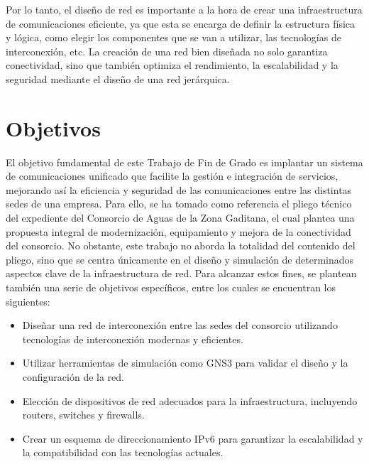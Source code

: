 \vspace{0.5cm}
Por lo tanto, el diseño de red es importante a la hora de crear una infraestructura de comunicaciones eficiente,
ya que esta se encarga de definir la estructura física y lógica, como elegir los componentes que se van a
utilizar, las tecnologías de interconexión, etc. La creación de una red bien diseñada no solo garantiza
conectividad, sino que también optimiza el rendimiento, la escalabilidad y la seguridad mediante el
diseño de una red jerárquica.

\section{Objetivos}
El objetivo fundamental de este Trabajo de Fin de Grado es implantar un sistema de comunicaciones unificado que facilite la gestión e integración de servicios, mejorando así la eficiencia y seguridad de las comunicaciones entre las distintas sedes de una empresa. Para ello, se ha tomado como referencia el pliego técnico del expediente \cite{expediente0062020} del Consorcio de Aguas de la Zona Gaditana, el cual plantea una propuesta integral de modernización, equipamiento y mejora de la conectividad del consorcio. No obstante, este trabajo no aborda la totalidad del contenido del pliego, sino que se centra únicamente en el diseño y simulación de determinados aspectos clave de la infraestructura de red. Para alcanzar estos fines, 
se plantean también una serie de objetivos específicos, entre los cuales se encuentran los siguientes:

\begin{itemize}
  \item Diseñar una red de interconexión entre las sedes del consorcio utilizando tecnologías de interconexión modernas y eficientes.
  \item Utilizar herramientas de simulación como GNS3 para validar el diseño y la configuración de la red.
  \item Elección de dispositivos de red adecuados para la infraestructura, incluyendo routers, switches y firewalls.
  \item Crear un esquema de direccionamiento IPv6 para garantizar la escalabilidad y la compatibilidad con las tecnologías actuales.
\end{itemize}

\newpage

